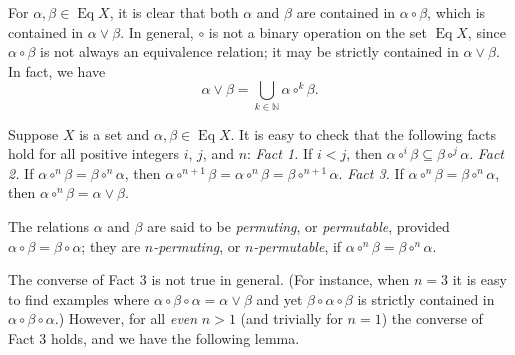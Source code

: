 \documentclass[11pt,reqno]{amsart}
\theoremstyle{plain}
\theoremstyle{definition}
\theoremstyle{remark}
\newcommand{\<}{\ensuremath{\langle}}
\renewcommand{\>}{\ensuremath{\rangle}}
\newcommand{\N}{\ensuremath{\mathbb{N}}}
\newcommand{\join}{\ensuremath{\vee}}
\newcommand{\Eq}{\ensuremath{\operatorname{Eq}}}
\newcommand{\circi}{\ensuremath{\circ^{i}}}
\newcommand{\circj}{\ensuremath{\circ^{j}}}
\newcommand{\circn}{\ensuremath{\circ^{n}}}
\begin{document}
For $\alpha, \beta \in \Eq X$, it is clear that both
$\alpha$ and $\beta$ are contained in $\alpha \circ \beta$, which is contained in
$\alpha \join \beta$.  In general, $\circ$ is not a binary operation on the set
$\Eq X$, since $\alpha \circ \beta$ is not always an equivalence relation; it may
be strictly contained in $\alpha \join \beta$. In fact, we have
\[
\alpha \join \beta = \bigcup_{k\in \N} \alpha \circ^k \beta.
\]

Suppose $X$ is a set and $\alpha, \beta \in \Eq X$.  It is easy
to check that the following facts hold for all positive integers $i$, $j$, and $n$:
\vskip2mm
\noindent 
{\it Fact 1.} If $i < j$, then $\alpha \circi \beta \subseteq \beta \circj \alpha$.
\vskip2mm
\noindent 
{\it Fact 2.} If $\alpha\circn \beta = \beta \circn \alpha$, then 
$\alpha\circ^{n+1} \beta =
\alpha\circn \beta = %
\beta\circ^{n+1} \alpha$.
\vskip2mm
\noindent 
{\it Fact 3.} If $\alpha\circn \beta = \beta \circn \alpha$, then 
$\alpha\circn \beta = \alpha \join \beta$.
\vskip2mm
\noindent

The relations $\alpha$ and $\beta$ are said to be \emph{permuting}, or
\emph{permutable}, provided $\alpha \circ \beta = \beta \circ \alpha$; they
are \emph{$n$-permuting}, or \emph{$n$-permutable}, if
$\alpha \circ^{n} \beta = \beta \circ^{n} \alpha$.

The converse of Fact 3 is not true in general.  
(For instance, when $n=3$ it is easy to find
examples where $\alpha \circ \beta \circ \alpha = \alpha
\join \beta$ and yet $\beta \circ \alpha \circ \beta$ is 
strictly contained in $\alpha \circ \beta \circ \alpha$.)
However,
 for all \emph{even} $n>1$ (and trivially for $n=1$) the converse of Fact 3 holds, and we have the
following lemma.
\end{document}
